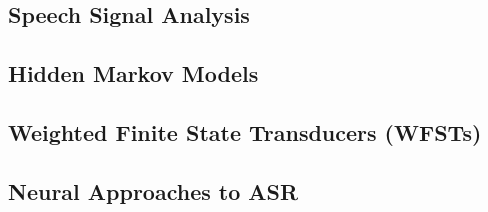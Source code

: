 \documentclass[9pt]{extarticle}
\begin{document}
  \begin{multicols}{2}
  \subsection*{Speech Signal Analysis}
  
  \subsection*{Hidden Markov Models}
  
  \subsection*{Weighted Finite State Transducers (WFSTs)}
  
  \newpage
  \subsection*{Neural Approaches to ASR}
  
  \end{multicols}
\end{document}
